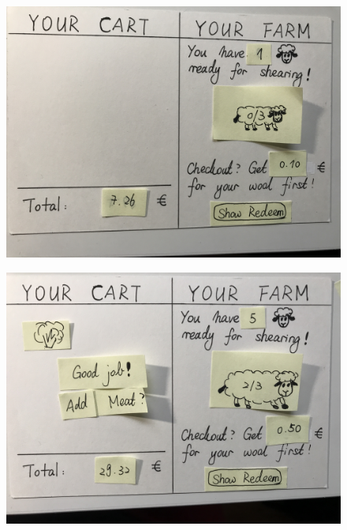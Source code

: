 \documentclass[a4paper,10pt,oneside]{scrreprt}
\begin{document}
\begin{figure}[h]
	\centering
	\includegraphics[scale=0.10, clip, trim={0em 0em 0em 0em}]{images/IMG_0579.jpg}
\end{figure}

\begin{figure}[h]
	\centering
	\includegraphics[scale=0.10, clip, trim={0em 0em 0em 0em}]{images/IMG_0580.jpg}
\end{figure}
\end{document}
